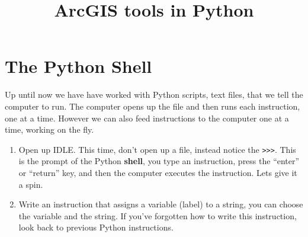\documentclass{article}
\begin{document}
\title{ArcGIS tools in Python}
\maketitle

\section{The Python Shell}
Up until now we have have worked with Python scripts, text files, that we tell the computer to run.  The computer opens up the file and then runs each instruction, one at a time.  However we can also feed instructions to the computer one at a time, working on the fly.
\begin{enumerate}
    \item Open up IDLE.  This time, don't open up a file, instead notice the \texttt{>>>}.  This is the prompt of the Python \textbf{shell}, you type an instruction, press the ``enter'' or ``return'' key, and then the computer executes the instruction.  Lets give it a spin.
    \item Write an instruction that assigns a variable (label) to a string, you can choose the variable and the string.  If you've forgotten how to write this instruction, look back to previous Python instructions.


\end{enumerate}
\end{document}
